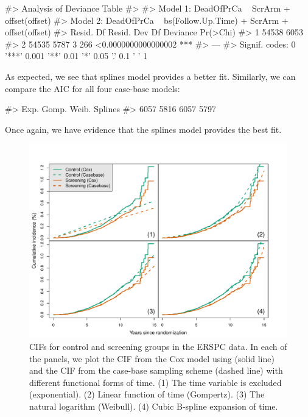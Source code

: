 \documentclass[
]{jss}
\begin{document}
\begin{CodeChunk}

\begin{CodeOutput}
#> Analysis of Deviance Table
#> 
#> Model 1: DeadOfPrCa ~ ScrArm + offset(offset)
#> Model 2: DeadOfPrCa ~ bs(Follow.Up.Time) + ScrArm + offset(offset)
#>   Resid. Df Resid. Dev Df Deviance            Pr(>Chi)    
#> 1     54538       6053                                    
#> 2     54535       5787  3      266 <0.0000000000000002 ***
#> ---
#> Signif. codes:  0 '***' 0.001 '**' 0.01 '*' 0.05 '.' 0.1 ' ' 1
\end{CodeOutput}
\end{CodeChunk}

As expected, we see that splines model provides a better fit. Similarly,
we can compare the AIC for all four case-base models:

\begin{CodeChunk}

\begin{CodeOutput}
#>    Exp.   Gomp.   Weib. Splines 
#>    6057    5816    6057    5797
\end{CodeOutput}
\end{CodeChunk}

Once again, we have evidence that the splines model provides the best
fit.

\begin{CodeChunk}
\begin{figure}

{\centering \includegraphics[width=\textwidth,keepaspectratio=true]{../figures/erspc-cox-cif-1} 

}

\caption{CIFs for control and screening groups in the ERSPC data. In each of the panels, we plot the CIF from the Cox model using  (solid line) and the CIF from the case-base sampling scheme (dashed line) with different functional forms of time. (1) The time variable is excluded (exponential). (2) Linear function of time (Gompertz). (3) The natural logarithm (Weibull). (4) Cubic B-spline expansion of time.}\label{fig:erspc-cox-cif}
\end{figure}
\end{CodeChunk}
\end{document}

